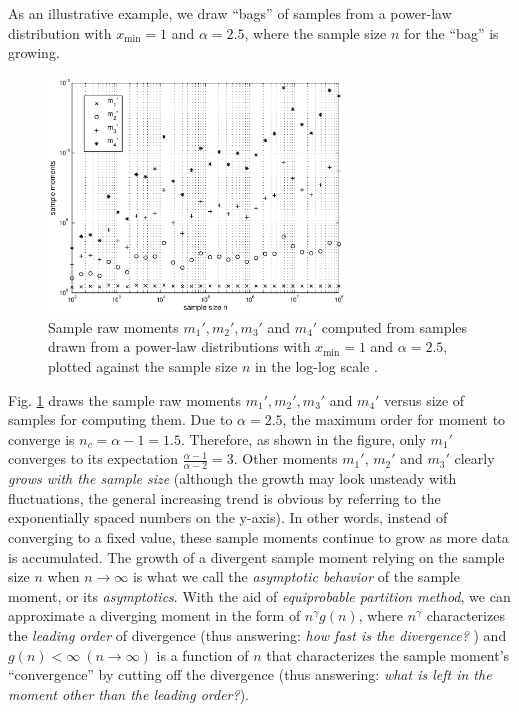 As an illustrative example, we draw ``bags'' of samples from a power-law distribution with $ x_{\min}=1 $ and $ \alpha=2.5 $, where the sample size $ n $ for the ``bag'' is growing. 
\begin{figure}[!h]
\begin{center}
\includegraphics[width=0.7\textwidth]{figures/ch2_moment_grow.eps}
\caption{Sample raw moments $ m_1', m_2', m_3' $ and $ m_4' $  computed from samples drawn from a power-law distributions with $ x_{\min}=1 $ and $ \alpha=2.5 $, plotted against the sample size $ n $ in the log-log scale .  }
\label{fig:ch2_moment_grow}
\end{center}
\end{figure}
Fig. \ref{fig:ch2_moment_grow} draws the sample raw moments $ m_1', m_2', m_3' $ and $ m_4' $ versus size of samples for computing them. Due to $ \alpha=2.5 $, the maximum order for moment to converge is $ n_c = \alpha-1=1.5 $. Therefore, as shown in the figure, only $ m_1' $ converges to its expectation $ \frac{\alpha -1}{\alpha -2}=3 $. Other moments $ m_1' $, $ m_2' $ and $ m_3' $ clearly \textit{grows with the sample size} (although the growth may look unsteady with fluctuations, the general increasing trend is obvious by referring to the exponentially spaced numbers on the y-axis). In other words, instead of converging to a fixed value, these sample moments continue to grow as more data is accumulated. The growth of a divergent sample moment relying on the sample size $ n $ when $ n \rightarrow \infty $ is what we call the \textit{asymptotic behavior} of the sample moment, or its \textit{asymptotics}. With the aid of \textit{equiprobable partition method}, we can approximate a diverging moment in the form of $ n^{\gamma} g(n) $, where $ n^{\gamma} $ characterizes the \textit{leading order} of divergence (thus answering: \textit{how fast is the divergence?} ) and $ g(n) < \infty \ (n \rightarrow \infty ) $ is a function of $ n $ that characterizes the sample moment's ``convergence'' by cutting off the divergence (thus answering: \textit{what is left in the moment other than the leading order?}).


